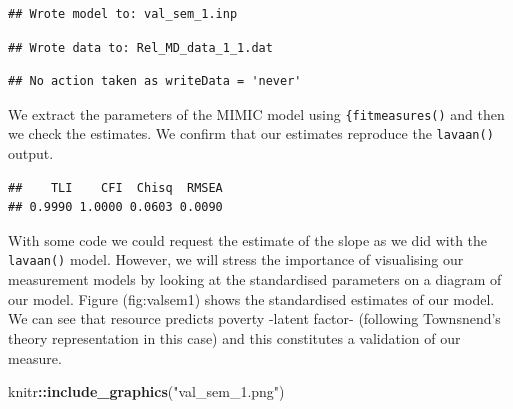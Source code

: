 \documentclass[]{book}
\newenvironment{Shaded}{\begin{snugshade}}{\end{snugshade}}
\newcommand{\DataTypeTok}[1]{\textcolor[rgb]{0.13,0.29,0.53}{#1}}
\newcommand{\KeywordTok}[1]{\textcolor[rgb]{0.13,0.29,0.53}{\textbf{#1}}}
\newcommand{\NormalTok}[1]{#1}
\newcommand{\OperatorTok}[1]{\textcolor[rgb]{0.81,0.36,0.00}{\textbf{#1}}}
\newcommand{\StringTok}[1]{\textcolor[rgb]{0.31,0.60,0.02}{#1}}
\begin{document}
\begin{verbatim}
## Wrote model to: val_sem_1.inp
\end{verbatim}

\begin{verbatim}
## Wrote data to: Rel_MD_data_1_1.dat
\end{verbatim}

\begin{verbatim}
## No action taken as writeData = 'never'
\end{verbatim}

We extract the parameters of the MIMIC model using \texttt{\{fitmeasures()} and then we check the estimates. We confirm that our estimates reproduce the \texttt{lavaan()} output.

\begin{Shaded}
\end{Shaded}

\begin{verbatim}
##    TLI    CFI  Chisq  RMSEA 
## 0.9990 1.0000 0.0603 0.0090
\end{verbatim}

With some code we could request the estimate of the slope as we did with the \texttt{lavaan()} model. However, we will stress the importance of visualising our measurement models by looking at the standardised parameters on a diagram of our model. Figure (fig:valsem1) shows the standardised estimates of our model. We can see that resource predicts poverty -latent factor- (following Townsnend's theory representation in this case) and this constitutes a validation of our measure.

\begin{Shaded}
\begin{Highlighting}[]
\NormalTok{knitr}\OperatorTok{::}\KeywordTok{include_graphics}\NormalTok{(}\StringTok{"val_sem_1.png"}\NormalTok{)}
\end{Highlighting}
\end{Shaded}
\end{document}
